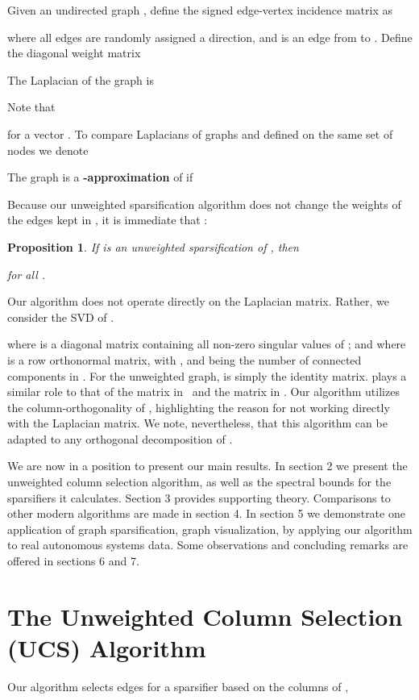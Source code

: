 \documentclass[final,leqno,onefignum,onetabnum]{siamltex1213}
\newtheorem{prop}[theorem]{Proposition}
\begin{document}
Given an undirected graph , define the signed edge-vertex incidence matrix  as

where all edges are randomly assigned a direction, and  is an edge from  to .  Define the diagonal weight matrix 

The Laplacian of the graph is

Note that 

for a vector .  To compare Laplacians of graphs  and  defined
on the same set of nodes we denote

\begin{definition} 
The graph  is a {\bf -approximation} of  if

\end{definition}
Because our unweighted sparsification algorithm does not change the weights of
the edges kept in , it is immediate that :
\begin{prop} \label{prop:upp}
If  is an unweighted sparsification of , then

\proof

for all .
\hspace{2 em}\endproof
\end{prop}

Our algorithm does not operate directly on the Laplacian matrix.  Rather, we consider the SVD of .



\noindent where  is a diagonal matrix containing all non-zero singular values of ; and where  is a row orthonormal matrix, with , and  being the number of connected components in . For the unweighted graph,  is simply the
identity matrix.  plays a similar role to that of the matrix
 in~\cite{ramanujansparse} and the matrix  in \cite{fasterSub}.  Our algorithm utilizes the column-orthogonality of , highlighting the reason for not working directly with the Laplacian matrix.  We note, nevertheless, that this algorithm can be adapted to any orthogonal decomposition of .

We are now in a position to present our main results.  In section 2 we present the unweighted column selection algorithm, as well as the spectral bounds for the sparsifiers it calculates.  Section 3 provides supporting theory.  Comparisons to other modern algorithms are made in section 4.  In section 5 we demonstrate one application of graph sparsification, graph visualization, by applying our algorithm to real autonomous systems data.  Some observations and concluding remarks are offered in sections 6 and 7.

\section{The Unweighted Column Selection (UCS) Algorithm}
Our algorithm selects edges for a sparsifier based on the columns  of ,
\end{document}

